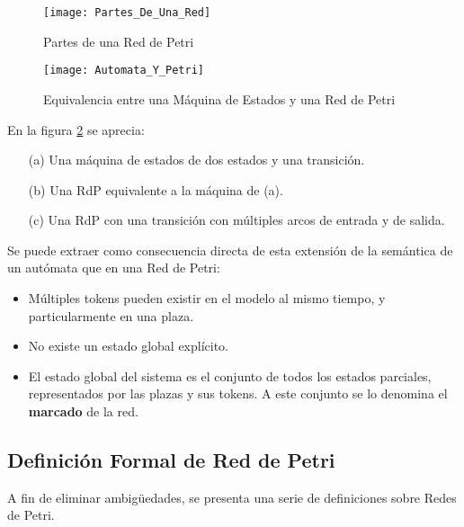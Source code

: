 \begin{figure}[H]
	\centering
	\texttt{[image: Partes\_De\_Una\_Red]}
	\caption{Partes de una Red de Petri}
	\label{fig:partes_de_una_red}
\end{figure}

\begin{figure}[H]
    \centering
    \texttt{[image: Automata\_Y\_Petri]}
    \caption{Equivalencia entre una Máquina de Estados y una Red de Petri}
    \label{fig:automata_y_petri}
\end{figure}

En la figura \ref{fig:automata_y_petri} se aprecia:\\
\begin{itemize}
  \item[(a)] Una máquina de estados de dos estados y una transición.
  \item[(b)] Una RdP equivalente a la máquina de (a).
  \item[(c)] Una RdP con una transición con múltiples arcos de entrada y de
  salida.
\end{itemize}

Se puede extraer como consecuencia directa de esta extensión de la semántica de
un autómata que en una Red de Petri:
\begin{itemize}
  \item Múltiples tokens pueden existir en el modelo al mismo tiempo, y
  particularmente en una plaza.
  \item No existe un estado global explícito.
  \item El estado global del sistema es el conjunto de todos los estados
  parciales, representados por las plazas y sus tokens. A este conjunto se lo
  denomina el \textbf{marcado} de la red.
\end{itemize}

\subsection{Definición Formal de Red de Petri}
\label{def_formal_petri}
A fin de eliminar ambigüedades, se presenta una serie de definiciones sobre
Redes de Petri.

